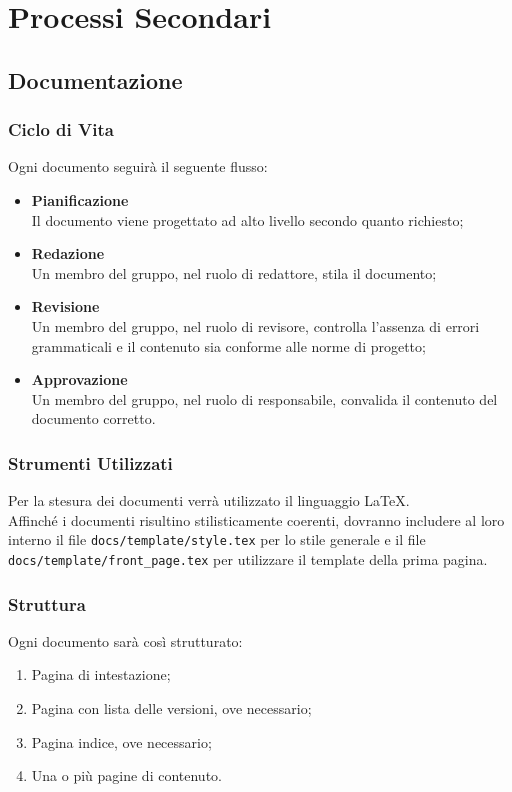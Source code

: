 \documentclass[a4paper, 12pt]{article}
\begin{document}
\section{Processi Secondari}
\subsection{Documentazione}
\subsubsection{Ciclo di Vita}
Ogni documento seguirà il seguente flusso:
\begin{itemize}
    \item \textbf{Pianificazione} \\ Il documento viene progettato ad alto livello secondo quanto richiesto;
    \item \textbf{Redazione} \\ Un membro del gruppo, nel ruolo di redattore, stila il documento;
    \item \textbf{Revisione} \\ Un membro del gruppo, nel ruolo di revisore, controlla l'assenza di errori grammaticali e il contenuto sia conforme alle norme di progetto;
    \item \textbf{Approvazione} \\ Un membro del gruppo, nel ruolo di responsabile, convalida il contenuto del documento corretto.
\end{itemize}

\subsubsection{Strumenti Utilizzati}
Per la stesura dei documenti verrà utilizzato il linguaggio \LaTeX. \\
Affinché i documenti risultino stilisticamente coerenti, dovranno includere al loro interno il file \texttt{docs/template/style.tex} per lo stile generale e il file \texttt{docs/template/front\_page.tex} per utilizzare il template della prima pagina.

\subsubsection{Struttura}
Ogni documento sarà così strutturato:
\begin{enumerate}
    \item Pagina di intestazione;
    \item Pagina con lista delle versioni, ove necessario;
    \item Pagina indice, ove necessario;
    \item Una o più pagine di contenuto.
\end{enumerate}
\end{document}
